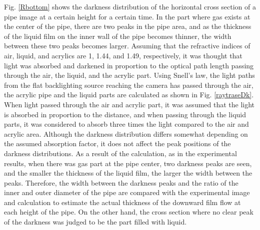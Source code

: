 \documentclass[aps,pre,preprint,groupedaddress,showkeys]{revtex4-2}
\begin{document}
Fig. \ref{Rbottom} shows the darkness distribution of the horizontal cross section of a pipe image at a certain height for a certain time.
In the part where gas exists at the center of the pipe, there are two peaks in the pipe area, and as the thickness of the liquid film on the inner wall of the pipe becomes thinner, the width between these two peaks becomes larger.
Assuming that the refractive indices of air, liquid, and acrylics are 1, 1.44, and 1.49, respectively, it was thought that light was absorbed and darkened in proportion to the optical path length passing through the air, the liquid, and the acrylic part.
Using Snell's law, the light paths from the flat backlighting source reaching the camera has passed through the air, the acrylic pipe and the liquid parts are calculated as shown in Fig. \ref{raytraseDk}.
When light passed through the air and acrylic part, it was assumed that the light is absorbed in proportion to the distance, and when passing through the liquid parts, it was considered to absorb three times the light compared to the air and acrylic area.
Although the darkness distribution differs somewhat depending on the assumed absorption factor, it does not affect the peak positions of the darkness distributions.
As a result of the calculation, as in the experimental results, when there was gas part at the pipe center, two darkness peaks are seen, and the smaller the thickness of the liquid film, the larger the width between the peaks.
Therefore, the width between the darkness peaks and the ratio of the inner and outer diameter of the pipe are compared with the experimental image and calculation to estimate the actual thickness of the downward film flow at each height of the pipe.
On the other hand, the cross section where no clear peak of the darkness was judged to be the part filled with liquid.
\end{document}
